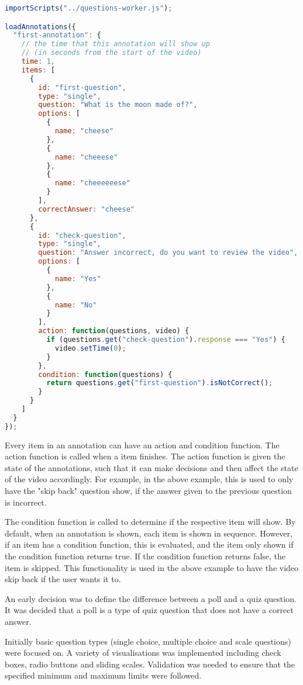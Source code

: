 \begin{lstlisting}[language=javascript]
importScripts("../questions-worker.js");

loadAnnotations({
  "first-annotation": {
    // the time that this annotation will show up
    // (in seconds from the start of the video)
    time: 1,
    items: [
      {
        id: "first-question",
        type: "single",
        question: "What is the moon made of?",
        options: [
          {
            name: "cheese"
          },
          {
            name: "cheeese"
          },
          {
            name: "cheeeeeese"
          }
        ],
        correctAnswer: "cheese"
      },
      {
        id: "check-question",
        type: "single",
        question: "Answer incorrect, do you want to review the video",
        options: [
          {
            name: "Yes"
          },
          {
            name: "No"
          }
        ],
        action: function(questions, video) {
          if (questions.get("check-question").response === "Yes") {
            video.setTime(0);
          }
        },
        condition: function(questions) {
          return questions.get("first-question").isNotCorrect();
        }
      }
    ]
  }
});
\end{lstlisting}

Every item in an annotation can have an action and condition function. The
action function is called when a item finishes. The action function is given
the state of the annotations, such that it can make decisions and then affect
the state of the video accordingly. For example, in the above example, this is
used to only have the "skip back" question show, if the answer given to the
previous question is incorrect.

The condition function is called to determine if the respective item will show.
By default, when an annotation is shown, each item is shown in sequence.
However, if an item has a condition function, this is evaluated, and the item
only shown if the condition function returns true. If the condition function
returns false, the item is skipped. This functionality is used in the above
example to have the video skip back if the user wants it to.


An early decision was to define the difference between a poll and a quiz
question. It was decided that a poll is a type of quiz question that does not
have a correct answer.

Initially basic question types (single choice, multiple choice and scale
questions) were focused on. A variety of visualisations was implemented
including check boxes, radio buttons and sliding scales. Validation was needed
to ensure that the specified minimum and maximum limits were followed.

